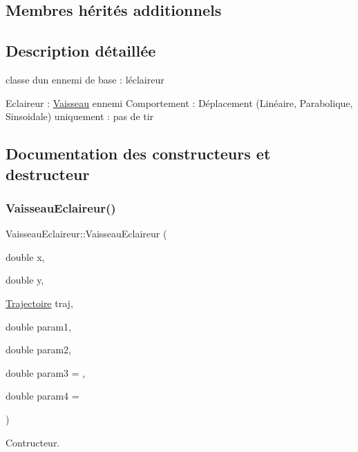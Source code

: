 \subsection*{Membres hérités additionnels}


\subsection{Description détaillée}
classe d\textquotesingle{}un ennemi de base \+: l\textquotesingle{}éclaireur 

Eclaireur \+: \hyperlink{class_vaisseau}{Vaisseau} ennemi Comportement \+: Déplacement (Linéaire, Parabolique, Sinsoidale) uniquement \+: pas de tir 

\subsection{Documentation des constructeurs et destructeur}
\mbox{\label{class_vaisseau_eclaireur_ad2c1dc461224dda7e4087a8e5a907c23}} 
\subsubsection{\texorpdfstring{Vaisseau\+Eclaireur()}{VaisseauEclaireur()}}
{\footnotesize\ttfamily Vaisseau\+Eclaireur\+::\+Vaisseau\+Eclaireur (\begin{DoxyParamCaption}\item[{double}]{x,  }\item[{double}]{y,  }\item[{\hyperlink{_trajectoire_8h_afa7f6e8323d7ee755d93cd1f6019dd95}{Trajectoire}}]{traj,  }\item[{double}]{param1,  }\item[{double}]{param2,  }\item[{double}]{param3 = {},  }\item[{double}]{param4 = {} }\end{DoxyParamCaption})}



Contructeur. 


